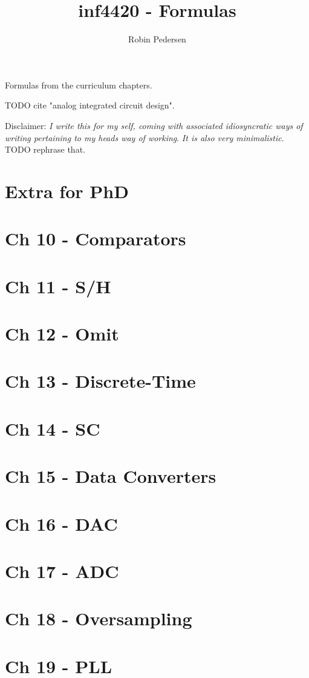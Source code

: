 \documentclass[a4paper,twocolumn]{article}
\begin{document}
  \title{inf4420 - Formulas}
  \author{Robin Pedersen}
  \maketitle

  Formulas from the curriculum chapters.

  TODO cite "analog integrated circuit design".

  Disclaimer: \emph{I write this for my self, coming with associated
  idiosyncratic ways of writing pertaining to my heads way of working}.
  \emph{It is also very minimalistic}.
  TODO rephrase that.

  \section{Extra for PhD}
    
  \section{Ch 10 - Comparators}
    
  \section{Ch 11 - S/H}
    
  \section{Ch 12 - Omit}
  \section{Ch 13 - Discrete-Time}
    
  \section{Ch 14 - SC}
    
  \section{Ch 15 - Data Converters}
    
  \section{Ch 16 - DAC}
    
  \section{Ch 17 - ADC}
    
  \section{Ch 18 - Oversampling}
    
  \section{Ch 19 - PLL}
    
\end{document}

